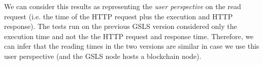 We can consider this results as representing the \textit{user perspective} on the read request (i.e. the time  of the HTTP request plus the execution and HTTP response). The tests run on the previous GSLS version considered only the execution time and not the the HTTP request and response time. Therefore, we can infer that the reading times in the two versions are similar in case we use this user perspective (and the GSLS node hosts a blockchain node).



